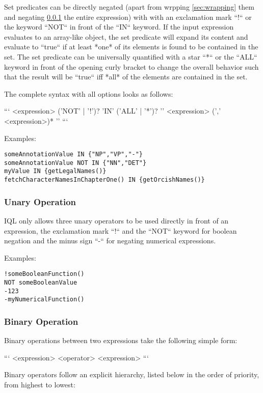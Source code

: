 \documentclass[11pt]{article}
\begin{document}
Set predicates can be directly negated (apart from wrpping \cref{sec:wrapping} them and negating \cref{sec:unary-operation} the entire expression) with with an exclamation mark ``!`` or the keyword ``NOT`` in front of the ``IN`` keyword. If the input expression evaluates to an array-like object, the set predicate will expand its content and evaluate to ``true`` if at least *one* of its elements is found to be contained in the set. The set predicate can be universally quantified with a star ``*`` or the ``ALL`` keyword in front of the opening curly bracket to change the overall behavior such that the result will be ``true`` iff *all* of the elements are contained in the set.

The complete syntax with all options looks as follows: 

```
<expression> ('NOT' | '!')? 'IN' ('ALL' | '*')? '{' <expression> (',' <expression>)* '}' 
```

Examples:

\begin{verbatim}
someAnnotationValue IN {"NP","VP","-"}
someAnnotationValue NOT IN {"NN","DET"}
myValue IN {getLegalNames()}
fetchCharacterNamesInChapterOne() IN {getOrcishNames()}
\end{verbatim}

\subsubsection{Unary Operation}
\label{sec:unary-operation}

IQL only allows three unary operators to be used directly in front of an expression, the exclamation mark ``!`` and the ``NOT`` keyword for boolean negation and the minus sign ``-`` for negating numerical expressions.

Examples:

\begin{verbatim}
!someBooleanFunction()
NOT someBooleanValue
-123
-myNumericalFunction()
\end{verbatim}

\subsubsection{Binary Operation}
\label{sec:binary-operation}

Binary operations between two expressions take the following simple form:

```
<expression> <operator> <expression>
```

Binary operators follow an explicit hierarchy, listed below in the order of priority, from highest to lowest:
\end{document}

